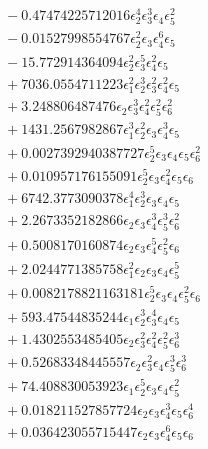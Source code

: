 \documentclass[10pt]{article}
\begin{document}
\begin{align*}
&{}  - 0.47474225712016 \epsilon_{2}^{4} \epsilon_{3}^{3} \epsilon_{4} \epsilon_{5}^{2} \\
&{}  - 0.01527998554767 \epsilon_{2}^{2} \epsilon_{3} \epsilon_{4}^{6} \epsilon_{5} \\
&{}  - 15.772914364094 \epsilon_{2}^{2} \epsilon_{3}^{5} \epsilon_{4}^{2} \epsilon_{5} \\
&{}  + 7036.0554711223 \epsilon_{1}^{2} \epsilon_{2}^{3} \epsilon_{3}^{2} \epsilon_{4}^{2} \epsilon_{5} \\
&{}  + 3.248806487476 \epsilon_{2} \epsilon_{3}^{3} \epsilon_{4}^{2} \epsilon_{5}^{2} \epsilon_{6}^{2} \\
&{}  + 1431.2567982867 \epsilon_{1}^{3} \epsilon_{2}^{2} \epsilon_{3} \epsilon_{4}^{3} \epsilon_{5} \\
&{}  + 0.0027392940387727 \epsilon_{2}^{5} \epsilon_{3} \epsilon_{4} \epsilon_{5} \epsilon_{6}^{2} \\
&{}  + 0.010957176155091 \epsilon_{2}^{5} \epsilon_{3} \epsilon_{4}^{2} \epsilon_{5} \epsilon_{6} \\
&{}  + 6742.3773090378 \epsilon_{1}^{4} \epsilon_{2}^{3} \epsilon_{3} \epsilon_{4} \epsilon_{5} \\
&{}  + 2.2673352182866 \epsilon_{2} \epsilon_{3} \epsilon_{4}^{3} \epsilon_{5}^{3} \epsilon_{6}^{2} \\
&{}  + 0.5008170160874 \epsilon_{2} \epsilon_{3} \epsilon_{4}^{5} \epsilon_{5}^{2} \epsilon_{6} \\
&{}  + 2.0244771385758 \epsilon_{1}^{2} \epsilon_{2} \epsilon_{3} \epsilon_{4} \epsilon_{5}^{5} \\
&{}  + 0.0082178821163181 \epsilon_{2}^{5} \epsilon_{3} \epsilon_{4} \epsilon_{5}^{2} \epsilon_{6} \\
&{}  + 593.47544835244 \epsilon_{1} \epsilon_{2}^{3} \epsilon_{3}^{4} \epsilon_{4} \epsilon_{5} \\
&{}  + 1.4302553485405 \epsilon_{2} \epsilon_{3}^{2} \epsilon_{4}^{2} \epsilon_{5}^{2} \epsilon_{6}^{3} \\
&{}  + 0.52683348445557 \epsilon_{2} \epsilon_{3}^{2} \epsilon_{4} \epsilon_{5}^{3} \epsilon_{6}^{3} \\
&{}  + 74.408830053923 \epsilon_{1} \epsilon_{2}^{5} \epsilon_{3} \epsilon_{4} \epsilon_{5}^{2} \\
&{}  + 0.018211527857724 \epsilon_{2} \epsilon_{3} \epsilon_{4}^{3} \epsilon_{5} \epsilon_{6}^{4} \\
&{}  + 0.036423055715447 \epsilon_{2} \epsilon_{3} \epsilon_{4}^{6} \epsilon_{5} \epsilon_{6} \\

\end{align*}
\end{document}
